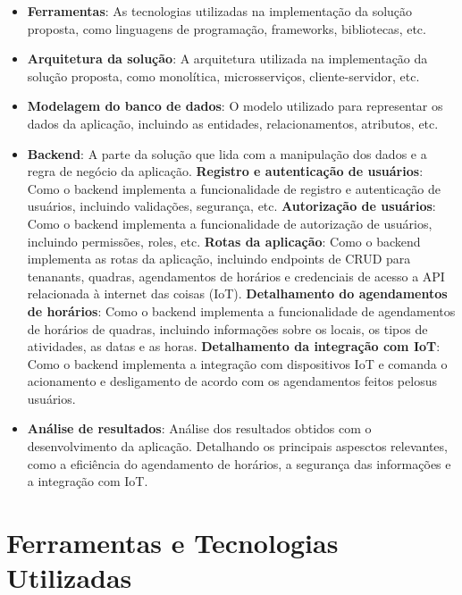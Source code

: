 \begin{itemize}
	\item \textbf{Ferramentas}: As tecnologias utilizadas na implementação da solução proposta, como linguagens de programação, frameworks, bibliotecas, etc.
	\item \textbf{Arquitetura da solução}: A arquitetura utilizada na implementação da solução proposta, como monolítica, microsserviços, cliente-servidor, etc.
	\item \textbf{Modelagem do banco de dados}: O modelo utilizado para representar os dados da aplicação, incluindo as entidades, relacionamentos, atributos, etc.
	\item \textbf{Backend}: A parte da solução que lida com a manipulação dos dados e a regra de negócio da aplicação.
	\subitem \textbf{Registro e autenticação de usuários}: Como o backend implementa a funcionalidade de registro e autenticação de usuários, incluindo validações, segurança, etc.
	\subitem \textbf{Autorização de usuários}: Como o backend implementa a funcionalidade de autorização de usuários, incluindo permissões, roles, etc.
	\subitem \textbf{Rotas da aplicação}: Como o backend implementa as rotas da aplicação, incluindo endpoints de CRUD para tenanants, quadras, agendamentos de horários e credenciais de acesso a API relacionada à internet das coisas (IoT).
	\subitem \textbf{Detalhamento do agendamentos de horários}: Como o backend implementa a funcionalidade de agendamentos de horários de quadras, incluindo informações sobre os locais, os tipos de atividades, as datas e as horas.
	\subitem \textbf{Detalhamento da integração com IoT}: Como o backend implementa a integração com dispositivos IoT e comanda o acionamento e desligamento de acordo com os agendamentos feitos pelosus usuários.
	\item \textbf{Análise de resultados}: Análise dos resultados obtidos com o desenvolvimento da aplicação. Detalhando os principais aspesctos relevantes, como a eficiência do agendamento de horários, a segurança das informações e a integração com IoT.
\end{itemize}

\section{Ferramentas e Tecnologias Utilizadas}\label{sec:ferramentas_tecnologias}

